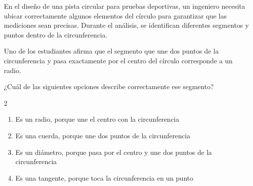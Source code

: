 En el diseño de una pista circular para pruebas deportivas, un ingeniero necesita ubicar correctamente algunos elementos del círculo para garantizar que las mediciones sean precisas. Durante el análisis, se identifican diferentes segmentos y puntos dentro de la circunferencia.

Uno de los estudiantes afirma que el segmento que une dos puntos de la circunferencia y pasa exactamente por el centro del círculo corresponde a un radio.

¿Cuál de las siguientes opciones describe correctamente ese segmento?

\begin{multicols}{2}
\begin{enumerate}[label=\alph*), leftmargin=*]
\item Es un radio, porque une el centro con la circunferencia
\item Es una cuerda, porque une dos puntos de la circunferencia
\item Es un diámetro, porque pasa por el centro y une dos puntos de la circunferencia
\item Es una tangente, porque toca la circunferencia en un punto
\end{enumerate}
\end{multicols}
